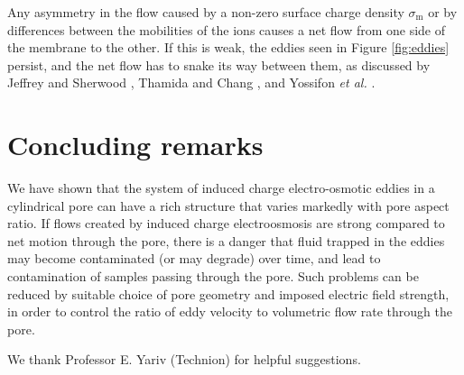 Any asymmetry in the flow caused by a non-zero
surface charge density $\sigma_\text{m}$
or by differences between the mobilities of the ions causes a net flow from
one side of the membrane to the other. If this is weak, the eddies
seen in Figure \ref{fig:eddies} persist, and the net flow has to snake its
way between them, as discussed by Jeffrey and Sherwood \cite{jeffrey1980},
Thamida and Chang \cite{Thamida2002}, and Yossifon {\it et al.}
\cite{yossifon2006}.


\section{Concluding remarks}

We have shown that the system of induced charge electro-osmotic eddies
in a cylindrical pore can have a rich structure that varies markedly
with pore aspect ratio. If flows created by induced charge electroosmosis
are strong
compared to net motion through the pore, there is a danger that
fluid trapped in the eddies may become contaminated (or may degrade)
over time, and lead to contamination of samples passing through the pore.
Such problems can be reduced by suitable choice of
pore geometry and imposed electric field strength, in order to control the
ratio of eddy velocity to volumetric flow rate through the pore.

We thank Professor E. Yariv (Technion) for helpful suggestions.
